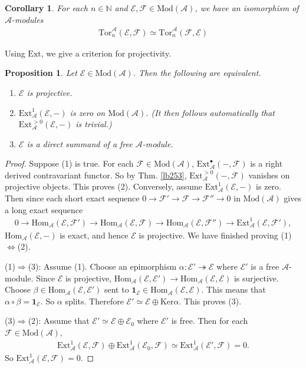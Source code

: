 \documentclass[12pt,b5paper,notitlepage]{report}
\theoremstyle{definition}
\theoremstyle{plain}
\newtheorem{pp}[df]{Proposition}
\newtheorem{co}[df]{Corollary}
\newcommand{\mc}{\mathcal}
\newcommand{\id}{\mathbf{1}}
\newcommand{\Hom}{\mathrm{Hom}}
\newcommand{\blt}{\bullet}
\newcommand{\Nbb}{\mathbb N}
\newcommand{\Ker}{\mathrm{Ker}}
\newcommand{\Ext}{\mathrm{Ext}}
\newcommand{\Tor}{\mathrm{Tor}}
\newcommand{\Mod}{\mathrm{Mod}}
\numberwithin{equation}{section}
\begin{document}
\begin{co}
For each $n\in\Nbb$ and $\mc E,\mc F\in\Mod(\mc A)$, we have an isomorphism of $\mc A$-modules
\begin{align*}
\Tor_n^{\mc A}(\mc E,\mc F)\simeq\Tor_n^{\mc A}(\mc F,\mc E)
\end{align*}
\end{co}

Using $\Ext$, we give a criterion for projectivity.

\begin{pp}\label{lb282}
Let $\mc E\in\Mod(\mc A)$. Then the following are equivalent.
\begin{enumerate}[label=(\arabic*)]
\item $\mc E$ is projective.
\item $\Ext^1_{\mc A}(\mc E,-)$ is zero on $\Mod(\mc A)$. (It then follows automatically that $\Ext^{>0}_{\mc A}(\mc E,-)$ is trivial.)
\item $\mc E$ is a direct summand of a free $\mc A$-module.
\end{enumerate} 
\end{pp}

\begin{proof}
Suppose (1) is true. For each $\mc F\in\Mod(\mc A)$, $\Ext_{\mc A}^\blt(-,\mc F)$ is a right derived  contravariant functor. So by Thm. \ref{lb253}, $\Ext_{\mc A}^{>0}(-,\mc F)$ vanishes on projective objects. This proves (2). Conversely, assume $\Ext_{\mc A}^1(\mc E,-)$ is zero. Then since each short exact sequence $0\rightarrow\mc F'\rightarrow\mc F\rightarrow\mc F''\rightarrow0$ in $\Mod(\mc A)$ gives a long exact sequence
\begin{align*}
0\rightarrow \Hom_{\mc A}(\mc E,\mc F')\rightarrow \Hom_{\mc A}(\mc E,\mc F)\rightarrow \Hom_{\mc A}(\mc E,\mc F'')\rightarrow \Ext_{\mc A}^1(\mc E,\mc F'),
\end{align*}
$\Hom_{\mc A}(\mc E,-)$ is exact, and hence $\mc E$ is projective. We have finished proving (1)$\Leftrightarrow$(2).

(1)$\Rightarrow$(3): Assume (1). Choose an epimorphism $\alpha:\mc E'\twoheadrightarrow\mc E$ where $\mc E'$ is a free $\mc A$-module. Since $\mc E$ is projective, $\Hom_{\mc A}(\mc E,\mc E')\rightarrow\Hom_{\mc A}(\mc E,\mc E)$ is surjective. Choose $\beta\in\Hom_{\mc A}(\mc E,\mc E')$ sent to $\id_{\mc E}\in\Hom_{\mc A}(\mc E,\mc E)$. This means that $\alpha\circ\beta=\id_{\mc E}$. So $\alpha$ splits. Therefore $\mc E'\simeq\mc E\oplus\Ker\alpha$. This proves (3).

(3)$\Rightarrow$(2): Assume that $\mc E'\simeq\mc E\oplus\mc E_0$ where $\mc E'$ is free. Then for each $\mc F\in\Mod(\mc A)$,
\begin{align*}
\Ext_{\mc A}^1(\mc E,\mc F)\oplus\Ext_{\mc A}^1(\mc E_0,\mc F)\simeq\Ext_{\mc A}^1(\mc E',\mc F)=0.
\end{align*}
So $\Ext_{\mc A}^1(\mc E,\mc F)=0$.
\end{proof}
\end{document}
